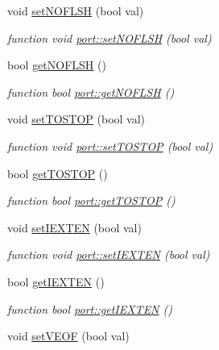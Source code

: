 \begin{DoxyCompactItemize}
void \hyperlink{classport_a5676edc2cd36b51b79987f01ca0159c9}{set\+N\+O\+F\+L\+SH} (bool val)
\begin{DoxyCompactList}\small\item\em function void \hyperlink{classport_a5676edc2cd36b51b79987f01ca0159c9}{port\+::set\+N\+O\+F\+L\+SH} (bool val) \end{DoxyCompactList}\item 
bool \hyperlink{classport_a90648b5c129f002697c88312d43404b5}{get\+N\+O\+F\+L\+SH} ()
\begin{DoxyCompactList}\small\item\em function bool \hyperlink{classport_a90648b5c129f002697c88312d43404b5}{port\+::get\+N\+O\+F\+L\+SH} () \end{DoxyCompactList}\item 
void \hyperlink{classport_a850aef33a8b6060e55b19dfee565bcc6}{set\+T\+O\+S\+T\+OP} (bool val)
\begin{DoxyCompactList}\small\item\em function void \hyperlink{classport_a850aef33a8b6060e55b19dfee565bcc6}{port\+::set\+T\+O\+S\+T\+OP} (bool val) \end{DoxyCompactList}\item 
bool \hyperlink{classport_a8c22333e40cecf5d0c9a21f11ab94b57}{get\+T\+O\+S\+T\+OP} ()
\begin{DoxyCompactList}\small\item\em function bool \hyperlink{classport_a8c22333e40cecf5d0c9a21f11ab94b57}{port\+::get\+T\+O\+S\+T\+OP} () \end{DoxyCompactList}\item 
void \hyperlink{classport_aee20c776c3696976fd00203343441e1b}{set\+I\+E\+X\+T\+EN} (bool val)
\begin{DoxyCompactList}\small\item\em function void \hyperlink{classport_aee20c776c3696976fd00203343441e1b}{port\+::set\+I\+E\+X\+T\+EN} (bool val) \end{DoxyCompactList}\item 
bool \hyperlink{classport_a513d3fa647f662f93467da579ae510e8}{get\+I\+E\+X\+T\+EN} ()
\begin{DoxyCompactList}\small\item\em function bool \hyperlink{classport_a513d3fa647f662f93467da579ae510e8}{port\+::get\+I\+E\+X\+T\+EN} () \end{DoxyCompactList}\item 
void \hyperlink{classport_a84c056e9f04f4fd3dc4200f6ba7279de}{set\+V\+E\+OF} (bool val)

\end{DoxyCompactItemize}
